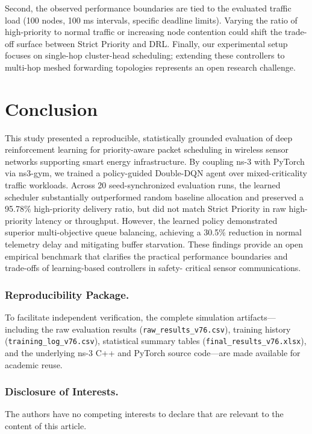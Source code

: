 \documentclass[runningheads,a4paper]{llncs}
\begin{document}
Second, the observed performance boundaries are tied to the evaluated traffic
load (100 nodes, 100 ms intervals, specific deadline limits). Varying the ratio of
high-priority to normal traffic or increasing node contention could shift the trade-
off surface between Strict Priority and DRL. Finally, our experimental setup
focuses on single-hop cluster-head scheduling; extending these controllers to
multi-hop meshed forwarding topologies represents an open research challenge.

\section{Conclusion}
This study presented a reproducible, statistically grounded evaluation of deep
reinforcement learning for priority-aware packet scheduling in wireless sensor
networks supporting smart energy infrastructure. By coupling ns-3 with
PyTorch via ns3-gym, we trained a policy-guided Double-DQN agent over
mixed-criticality traffic workloads. Across 20 seed-synchronized evaluation runs,
the learned scheduler substantially outperformed random baseline allocation and
preserved a 95.78\% high-priority delivery ratio, but did not match Strict Priority
in raw high-priority latency or throughput. However, the learned policy
demonstrated superior multi-objective queue balancing, achieving a 30.5\%
reduction in normal telemetry delay and mitigating buffer starvation. These
findings provide an open empirical benchmark that clarifies the practical
performance boundaries and trade-offs of learning-based controllers in safety-
critical sensor communications.

\subsubsection*{Reproducibility Package.}
To facilitate independent verification, the complete simulation artifacts—including
the raw evaluation results (\texttt{raw\_results\_v76.csv}), training history
(\texttt{training\_log\_v76.csv}), statistical summary tables
(\texttt{final\_results\_v76.xlsx}), and the underlying ns-3 C++ and PyTorch source
code—are made available for academic reuse.

\subsubsection*{Disclosure of Interests.}
The authors have no competing interests to declare that are relevant to the content of this article.

\nocite{*}


\end{document}
